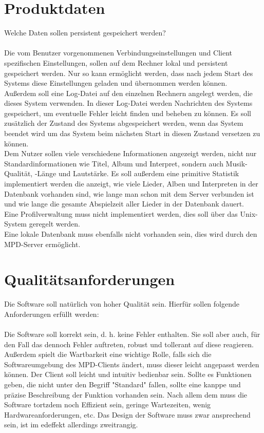 \section{Produktdaten}
Welche Daten sollen persistent gespeichert werden?\ \\ \\
Die vom Benutzer vorgenommenen Verbindungseinstellungen und Client spezifischen Einstellungen,
sollen auf dem Rechner lokal und persistent gespeichert werden. Nur so kann ermöglicht werden,
dass nach jedem Start des Systems diese Einstellungen geladen und übernommen werden können.\ \\
Außerdem soll eine Log-Datei auf den einzelnen Rechnern angelegt werden, die dieses System
verwenden. In dieser Log-Datei werden Nachrichten des Systems gespeichert, um eventuelle Fehler
leicht finden und beheben zu können. Es soll zusätzlich der Zustand des Systems abgespeichert werden,
wenn das System beendet wird um das System beim nächsten Start in diesen Zustand versetzen zu können.\ \\
Dem Nutzer sollen viele verschiedene Informationen angezeigt werden, nicht nur Standardinformationen
wie Titel, Album und Interpret, sondern auch Musik-Qualität, -Länge und Lautstärke.
Es soll außerdem eine primitive Statistik implementiert werden die anzeigt, wie viele Lieder, Alben und
Interpreten in der Datenbank vorhanden sind, wie lange man schon mit dem Server verbunden ist und wie 
lange die gesamte Abspielzeit aller Lieder in der Datenbank dauert.\ \\
Eine Profilverwaltung muss nicht implementiert werden, dies soll über das Unix-System geregelt werden.\ \\
Eine lokale Datenbank muss ebenfalls nicht vorhanden sein, dies wird durch den MPD-Server ermöglicht.\ \\
\section{Qualitätsanforderungen}
Die Software soll natürlich von hoher Qualität sein. Hierfür sollen folgende
Anforderungen erfüllt werden:\ \\ \\
Die Software soll korrekt sein, d. h. keine Fehler enthalten.
Sie soll aber auch, für den Fall das dennoch Fehler auftreten, robust
und tollerant auf diese reagieren. Außerdem spielt die Wartbarkeit 
eine wichtige Rolle, falls sich die Softwareumgebung des MPD-Clients
ändert, muss dieser leicht angepasst werden können.
Der Client soll leicht und intuitiv bedienbar sein. Sollte es Funktionen
geben, die nicht unter den Begriff "Standard" fallen, sollte eine kanppe
und präzise Beschreibung der Funktion vorhanden sein.
Nach allem dem muss die Software tortzdem noch Effizient sein, geringe
Wartezeiten, wenig Hardwareanforderungen, etc.
Das Design der Software muss zwar ansprechend sein, ist im edeffekt allerdings
zweitrangig.
